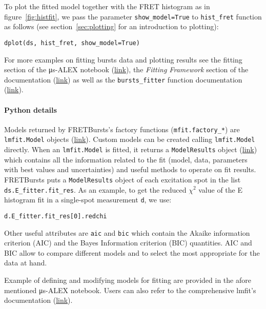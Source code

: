 To plot the fitted model together with the FRET histogram as in 
figure~\ref{fig:histfit}, we pass the parameter \verb|show_model=True| 
to \verb|hist_fret| function as follows 
(see section~\ref{sec:plotting} for an introduction to plotting):

\begin{lstlisting}
dplot(ds, hist_fret, show_model=True)
\end{lstlisting}

For more examples on fitting bursts data and plotting results see the
fitting section of the μs-ALEX notebook (\href{http://nbviewer.jupyter.org/github/tritemio/FRETBursts_notebooks/blob/master/notebooks/FRETBursts%20-%20us-ALEX%20smFRET%20burst%20analysis.ipynb#FRET-fit:-in-depth-example}{link}),
the \textit{Fitting Framework} section of the documentation 
(\href{http://fretbursts.readthedocs.org/en/latest/fit.html}{link})
as well as the \verb|bursts_fitter| function documentation
(\href{http://fretbursts.readthedocs.org/en/latest/plugins.html#fretbursts.burstlib_ext.bursts_fitter}{link}).

\paragraph{Python details}

Models returned by FRETBursts's factory functions (\verb|mfit.factory_*|) 
are \verb|lmfit.Model| objects (\href{https://lmfit.github.io/lmfit-py/model.html}{link}).
Custom models can be created calling \verb|lmfit.Model| directly.
When an \verb|lmfit.Model| is fitted, it returns a \verb|ModelResults| object 
(\href{https://lmfit.github.io/lmfit-py/model.html#the-modelresult-class}{link})
which contains all the information related to the fit (model, data, 
parameters with best values and uncertainties) and useful methods to operate on fit results. 
FRETBursts puts a \verb|ModelResults| object of each excitation spot in the list 
\verb|ds.E_fitter.fit_res|.
As an example, to get the reduced $\chi^2$ value of the E histogram fit in a 
single-spot measurement \verb|d|, we use:

\begin{lstlisting}
d.E_fitter.fit_res[0].redchi
\end{lstlisting}

Other useful attributes are \verb|aic| and \verb|bic| which contain the 
Akaike information criterion (AIC) and the Bayes Information criterion (BIC)
quantities. AIC and BIC allow to compare different models and
to select the most appropriate for the data at hand.

Example of defining and modifying models for fitting are provided in 
the afore mentioned μs-ALEX notebook.
Users can also refer to the comprehensive lmfit's documentation
(\href{http://lmfit.github.io/lmfit-py/}{link}).
